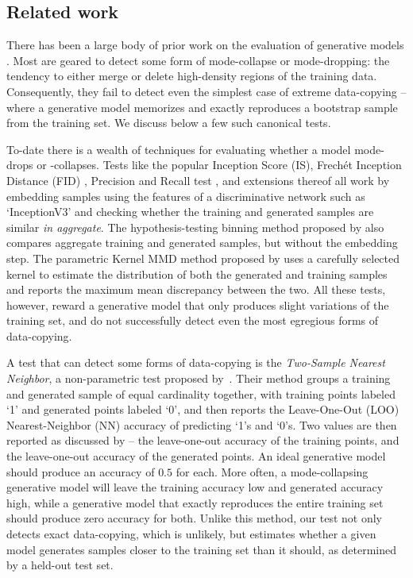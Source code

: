 \subsection{Related work}
\label{sec:better-global-test}

There has been a large body of prior work on the evaluation of generative models \citep{salimans,lopez, richardson, mehdi, Kilian, Ruslan_et_al} . Most are geared to detect some form of mode-collapse or mode-dropping: the tendency to either merge or delete high-density regions of the training data. Consequently, they fail to detect even the simplest case of extreme data-copying -- where a generative model memorizes and exactly reproduces a bootstrap sample from the training set. We discuss below a few such canonical tests.

To-date there is a wealth of techniques for evaluating whether a model mode-drops or -collapses. Tests like the popular Inception Score (IS), Frech\'et Inception Distance (FID) \citep{heusel}, Precision and Recall test \citep{mehdi}, and extensions thereof \citep{Kynk_improved, che_2016} all work by embedding samples using the features of a discriminative network such as `InceptionV3' and checking whether the training and generated samples are similar \emph{in aggregate}. The hypothesis-testing binning method proposed by \cite{richardson} also compares aggregate training and generated samples, but without the embedding step. The parametric Kernel MMD method proposed by \cite{gretton} uses a carefully selected kernel to estimate the distribution of both the generated and training samples and reports the maximum mean discrepancy between the two. All these tests, however, reward a generative model that only produces slight variations of the training set, and do not successfully detect even the most egregious forms of data-copying.

A test that can detect some forms of data-copying is the {\em{Two-Sample Nearest Neighbor}}, a non-parametric test proposed by~\cite{lopez}. Their method groups a training and generated sample of equal cardinality together, with training points labeled `1' and generated points labeled `0', and then reports the Leave-One-Out (LOO) Nearest-Neighbor (NN) accuracy of predicting `1's and `0's. Two values are then reported as discussed by \cite{Kilian} -- the leave-one-out accuracy of the training points, and the leave-one-out accuracy of the generated points. An ideal generative model should produce an accuracy of $0.5$ for each. More often, a mode-collapsing generative model will leave the training accuracy low and generated accuracy high, while a generative model that exactly reproduces the entire training set should produce zero accuracy for both. Unlike this method, our test not only detects exact data-copying, which is unlikely, but estimates whether a given model generates samples closer to the training set than it should, as determined by a held-out test set.

